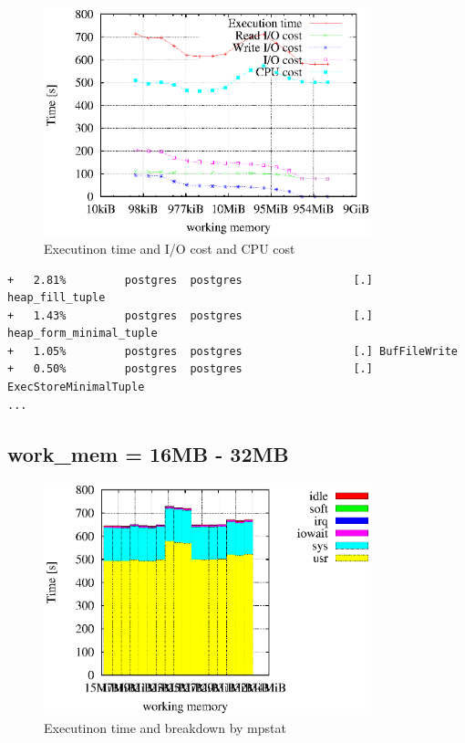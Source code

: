 \documentclass[11pt,a4paper]{jsarticle}
\begin{document}
\begin{figure}[thbp]
 \begin{center}
  \includegraphics[width=95mm]{q8exectime.eps}
 \end{center}
 \caption{Executinon time and I/O cost and CPU cost}
 \label{fig:q8exectime}
\end{figure}

\begin{verbatim}
+   2.81%         postgres  postgres                 [.] heap_fill_tuple
+   1.43%         postgres  postgres                 [.] heap_form_minimal_tuple
+   1.05%         postgres  postgres                 [.] BufFileWrite
+   0.50%         postgres  postgres                 [.] ExecStoreMinimalTuple
...
\end{verbatim}

\subsection{work\_mem = 16MB - 32MB}
\begin{figure}[thbp]
 \begin{center}
  \includegraphics[width=95mm]{q8_16_32_cputime.eps}
 \end{center}
 \caption{Executinon time and breakdown by mpstat}
 \label{fig:q8cputime1632}
\end{figure}
\end{document}
